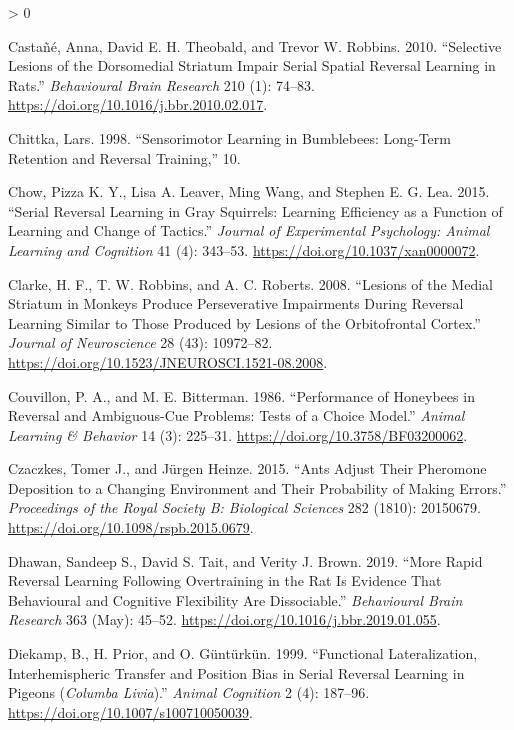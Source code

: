 \documentclass[
]{article}
\newlength{\cslhangindent}
\newenvironment{CSLReferences}[2] %
 {%
  \setlength{\parindent}{0pt}
  \ifodd #1 \everypar{\setlength{\hangindent}{\cslhangindent}}\ignorespaces\fi
  \ifnum #2 > 0
  \setlength{\parskip}{#2\baselineskip}
  \fi
 }%
 {}
\begin{document}
\begin{CSLReferences}{1}{0}
\leavevmode\hypertarget{ref-castane_selective_2010}{}%
Castañé, Anna, David E. H. Theobald, and Trevor W. Robbins. 2010. {``Selective Lesions of the Dorsomedial Striatum Impair Serial Spatial Reversal Learning in Rats.''} \emph{Behavioural Brain Research} 210 (1): 74--83. \url{https://doi.org/10.1016/j.bbr.2010.02.017}.

\leavevmode\hypertarget{ref-chittka_sensorimotor_1998}{}%
Chittka, Lars. 1998. {``Sensorimotor Learning in Bumblebees: Long-Term Retention and Reversal Training,''} 10.

\leavevmode\hypertarget{ref-chow_serial_2015}{}%
Chow, Pizza K. Y., Lisa A. Leaver, Ming Wang, and Stephen E. G. Lea. 2015. {``Serial Reversal Learning in Gray Squirrels: {Learning} Efficiency as a Function of Learning and Change of Tactics.''} \emph{Journal of Experimental Psychology: Animal Learning and Cognition} 41 (4): 343--53. \url{https://doi.org/10.1037/xan0000072}.

\leavevmode\hypertarget{ref-clarke_lesions_2008}{}%
Clarke, H. F., T. W. Robbins, and A. C. Roberts. 2008. {``Lesions of the {Medial} {Striatum} in {Monkeys} {Produce} {Perseverative} {Impairments} During {Reversal} {Learning} {Similar} to {Those} {Produced} by {Lesions} of the {Orbitofrontal} {Cortex}.''} \emph{Journal of Neuroscience} 28 (43): 10972--82. \url{https://doi.org/10.1523/JNEUROSCI.1521-08.2008}.

\leavevmode\hypertarget{ref-couvillon_performance_1986}{}%
Couvillon, P. A., and M. E. Bitterman. 1986. {``Performance of Honeybees in Reversal and Ambiguous-Cue Problems: {Tests} of a Choice Model.''} \emph{Animal Learning \& Behavior} 14 (3): 225--31. \url{https://doi.org/10.3758/BF03200062}.

\leavevmode\hypertarget{ref-czaczkes_ants_2015}{}%
Czaczkes, Tomer J., and Jürgen Heinze. 2015. {``Ants Adjust Their Pheromone Deposition to a Changing Environment and Their Probability of Making Errors.''} \emph{Proceedings of the Royal Society B: Biological Sciences} 282 (1810): 20150679. \url{https://doi.org/10.1098/rspb.2015.0679}.

\leavevmode\hypertarget{ref-dhawan_more_2019}{}%
Dhawan, Sandeep S., David S. Tait, and Verity J. Brown. 2019. {``More Rapid Reversal Learning Following Overtraining in the Rat Is Evidence That Behavioural and Cognitive Flexibility Are Dissociable.''} \emph{Behavioural Brain Research} 363 (May): 45--52. \url{https://doi.org/10.1016/j.bbr.2019.01.055}.

\leavevmode\hypertarget{ref-diekamp_functional_1999}{}%
Diekamp, B., H. Prior, and O. Güntürkün. 1999. {``Functional Lateralization, Interhemispheric Transfer and Position Bias in Serial Reversal Learning in Pigeons (\emph{{Columba} Livia}).''} \emph{Animal Cognition} 2 (4): 187--96. \url{https://doi.org/10.1007/s100710050039}.


\end{CSLReferences}
\end{document}

